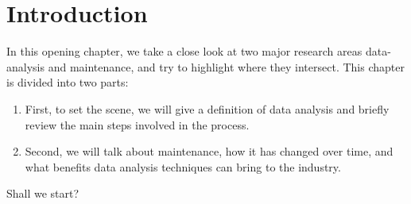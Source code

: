 \chapter{Introduction}
In this opening chapter, we take a close look at two major research areas data-analysis and maintenance, and try to highlight where they intersect.
This chapter is divided into two parts:
\begin{enumerate}
    \item First, to set the scene, we will give a definition of data analysis and briefly review the main steps involved in the process.
    \item Second, we will talk about maintenance, how it has changed over time, and what benefits data analysis techniques can bring to the industry.
\end{enumerate}
Shall we start?





